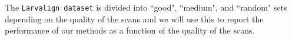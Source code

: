 \documentclass{book}
\begin{document}
	The \texttt{Larvalign dataset} is divided into ``good", ``medium", and ``random" sets depending on the quality of the scans and we will use this to report the performance of our methods as a function of the quality of the scans.	

\end{document}

